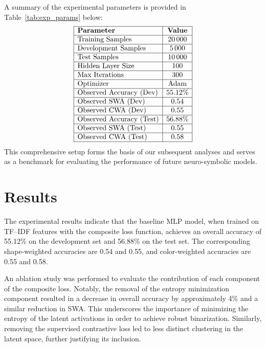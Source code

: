 \documentclass{article}
\begin{document}
A summary of the experimental parameters is provided in Table~\ref{tab:exp_params} below:
\[
\begin{array}{|l|c|}
\hline
\textbf{Parameter} & \textbf{Value} \\
\hline
\text{Training Samples} & 20\,000 \\
\hline
\text{Development Samples} & 5\,000 \\
\hline
\text{Test Samples} & 10\,000 \\
\hline
\text{Hidden Layer Size} & 100 \\
\hline
\text{Max Iterations} & 300 \\
\hline
\text{Optimizer} & \text{Adam} \\
\hline
\text{Observed Accuracy (Dev)} & 55.12\% \\
\hline
\text{Observed SWA (Dev)} & 0.54 \\
\hline
\text{Observed CWA (Dev)} & 0.55 \\
\hline
\text{Observed Accuracy (Test)} & 56.88\% \\
\hline
\text{Observed SWA (Test)} & 0.55 \\
\hline
\text{Observed CWA (Test)} & 0.58 \\
\hline
\end{array}
\]
This comprehensive setup forms the basis of our subsequent analyses and serves as a benchmark for evaluating the performance of future neuro-symbolic models.

\section{Results}
The experimental results indicate that the baseline MLP model, when trained on TF–IDF features with the composite loss function, achieves an overall accuracy of 55.12\% on the development set and 56.88\% on the test set. The corresponding shape-weighted accuracies are 0.54 and 0.55, and color-weighted accuracies are 0.55 and 0.58.

An ablation study was performed to evaluate the contribution of each component of the composite loss. Notably, the removal of the entropy minimization component resulted in a decrease in overall accuracy by approximately 4\% and a similar reduction in SWA. This underscores the importance of minimizing the entropy of the latent activations in order to achieve robust binarization. Similarly, removing the supervised contrastive loss led to less distinct clustering in the latent space, further justifying its inclusion.
\end{document}
